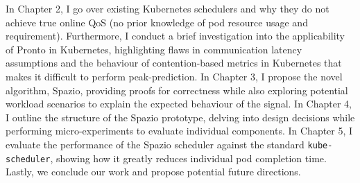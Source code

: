 In Chapter 2, I go over existing Kubernetes schedulers and why they do not
achieve true online QoS (no prior knowledge of pod resource usage and
requirement). Furthermore, I conduct a brief investigation into the
applicability of Pronto in Kubernetes, highlighting flaws in communication
latency assumptions and the behaviour of contention-based metrics in Kubernetes
that makes it difficult to perform peak-prediction. In Chapter 3, I propose the
novel algorithm, Spazio, providing proofs for correctness while also exploring
potential workload scenarios to explain the expected behaviour of the signal. In
Chapter 4, I outline the structure of the Spazio prototype, delving into design
decisions while performing micro-experiments to evaluate individual components.
In Chapter 5, I evaluate the performance of the Spazio scheduler against the standard
\verb|kube-scheduler|, showing how it greatly reduces individual pod completion
time. Lastly, we conclude our work and propose potential future directions.

